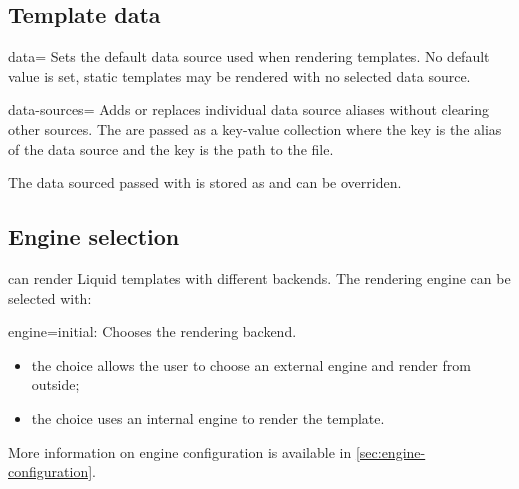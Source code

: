 
\subsection{Template data}
\label{ssec:template-data-options}

\begin{docKey}{data}{=}{} %
  Sets the default data source used when rendering templates. %
  No default value is set, static templates may be rendered with no selected data source. %
\end{docKey}
\begin{docKey}[][doc new=2025-11-21]{data-sources}{=}{} %
  Adds or replaces individual data source aliases without clearing other sources. %
  The  are passed as a key-value collection where the key is
  the alias of the data source and the key is the path to the file. %

  The data sourced passed with  is stored as
   and can be overriden. %
\end{docKey}

\subsection{Engine selection}
\label{ssec:engine-selection-options}

 can render
Liquid templates with different backends. %
The rendering engine can be selected with: %

\begin{docKey}[][doc description=\preambleonly]{engine}{=\textbar{}}{initial:
    }
  Chooses the rendering backend.

  \begin{itemize}
  \item the  choice allows the user to choose an external
    engine and render from outside;
  \item the  choice uses an internal engine to render the
    template.
  \end{itemize}

  More information on engine configuration is available in
  \cref{sec:engine-configuration}. %
\end{docKey}


